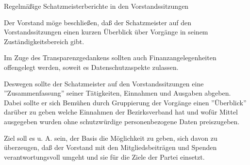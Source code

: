 \documentclass{protokoll}
\begin{document}
\begin{Antrag}
        {Regelmäßige Schatzmeisterberichte in den Vorstandssitzungen}
        {\angenommen}


\begin{Text}
Der Vorstand möge beschließen, daß der Schatzmeister auf den
Vorstandssitzungen einen kurzen Überblick über Vorgänge in seinem
Zuständigkeitsbereich gibt.
\end{Text}

\begin{Begründung}
Im Zuge des Transparenzgedankens sollten auch Finanzangelegenheiten
offengelegt werden, soweit es Datenschutzaspekte zulassen.

Deswegen sollte der Schatzmeister auf den Vorstandssitzungen eine
''Zusammenfassung'' seiner Tätigkeiten, Einnahmen und Ausgaben
abgeben. Dabei sollte er sich Bemühen durch Gruppierung der Vorgänge
einen ''Überblick'' darüber zu geben welche Einnahmen der
Bezirksverband hat und wofür Mittel ausgegeben wurden ohne
schutzwürdige personenbezogene Daten preiszugeben.

Ziel soll es u. A. sein, der Basis die Möglichkeit zu geben, sich
davon zu überzeugen, daß der Vorstand mit den Mitgliedsbeiträgen und
Spenden verantwortungsvoll umgeht und sie für die Ziele der Partei
einsetzt.
\end{Begründung}


\end{Antrag}
\end{document}
